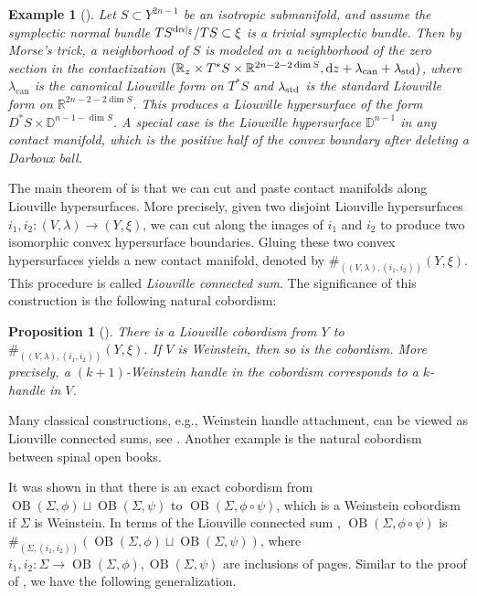 \documentclass[11pt]{amsart}
\numberwithin{equation}{section}
\newtheorem{proposition}[theorem]{\textbf{Proposition}}
\newtheorem{example}[theorem]{\textbf{Example}}
\def\R{\mathbb{R}}
\def\D{{\mathbb D}}
\def\rd{{\rm d}}
\def\std{\rm std}
\DeclareMathOperator{\OB}{OB}
\begin{document}
\begin{example}[{\cite[Example 1.5]{Russell}}]
    Let $S\subset Y^{2n-1}$ be an isotropic submanifold, and assume the symplectic normal bundle $TS^{\rd \alpha|_{\xi}}/TS \subset \xi$ is a trivial symplectic bundle. Then by Morse's trick, a neighborhood of $S$ is modeled on a neighborhood of the zero section in the contactization $(\R_z\times T^*S\times \R^{2n-2-2\dim S}, \rd z+\lambda_{\mathrm{can}}+\lambda_{\std} )$, where $\lambda_{\mathrm{can}}$ is the canonical Liouville form on $T^*S$ and $\lambda_{\std}$ is the standard Liouville form on $\R^{2n-2-2\dim S}$. This produces a Liouville hypersurface of the form $D^*S\times \D^{n-1-\dim S}$. A special case is the Liouville hypersurface $\D^{n-1}$ in any contact manifold, which is the positive half of the convex boundary after deleting a Darboux ball.
\end{example}

The main theorem of \cite{Russell} is that we can cut and paste contact manifolds along Liouville hypersurfaces. More precisely, given two disjoint Liouville hypersurfaces $i_1,i_2:(V,\lambda)\to (Y,\xi)$, we can cut along the images of $i_1$ and $i_2$ to produce two isomorphic convex hypersurface boundaries. Gluing these two convex hypersurfaces yields a new contact manifold, denoted by $\#_{((V,\lambda),(i_1,i_2))}(Y,\xi)$. This procedure is called \emph{Liouville connected sum}. The significance of this construction is the following natural cobordism:

\begin{proposition}[{\cite[Theorem 1.8]{Russell}}]
    There is a Liouville cobordism from $Y$ to $\#_{((V,\lambda),(i_1,i_2))}(Y,\xi)$. If $V$ is Weinstein, then so is the cobordism. More precisely, a $(k+1)$-Weinstein handle in the cobordism corresponds to a $k$-handle in $V$.
\end{proposition}

Many classical constructions, e.g., Weinstein handle attachment, can be viewed as Liouville connected sums, see \cite[Example 1.7]{Russell}. Another example is the natural cobordism between spinal open books.

It was shown in \cite{Russell,Baldwin,BEV,Klukas} that there is an exact cobordism from $\OB(\Sigma,\phi)\sqcup \OB(\Sigma,\psi)$ to $\OB(\Sigma,\phi\circ \psi)$, which is a Weinstein cobordism if $\Sigma$ is Weinstein. In terms of the Liouville connected sum \cite[Proposition 8.2]{Russell}, $\OB(\Sigma,\phi\circ \psi)$ is $\#_{(\Sigma,(i_1,i_2))}(\OB(\Sigma,\phi)\sqcup \OB(\Sigma,\psi))$, where $i_1,i_2:\Sigma \to \OB(\Sigma,\phi), \OB(\Sigma,\psi)$ are inclusions of pages. Similar to the proof of \cite[Proposition 8.2]{Russell}, we have the following generalization. 
\end{document}
